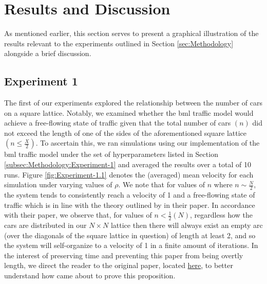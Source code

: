 \section{Results and Discussion}
\label{sec:Results-and-Discussion}
As mentioned earlier, this section serves to present a graphical illustration of the results relevant to the experiments outlined in Section \ref{sec:Methodology} alongside a brief discussion.

\subsection{Experiment 1}
\label{subsec:Results-and-Discussion:Experiment-1}
The first of our experiments explored the relationship between the number of cars on a square lattice. Notably, we examined whether the \gls{bml} traffic model would achieve a free-flowing state of traffic given that the total number of cars $(n)$ did not exceed the length of one of the sides of the aforementioned square lattice $\left(n \leq \frac{X}{2}\right)$. To ascertain this, we ran simulations using our implementation of the \gls{bml} traffic model under the set of hyperparameters listed in Section \ref{subsec:Methodology:Experiment-1} and averaged the results over a total of 10 runs. Figure \ref{fig:Experiment-1.1} denotes the (averaged) mean velocity for each simulation under varying values of $\rho$. We note that for values of $n$ where $n \sim \frac{N}{2}$, the system tends to consistently reach a velocity of 1 and a free-flowing state of traffic which is in line with the theory outlined by \citeauthor{Austin} in their paper. In accordance with their paper, we observe that, for values of  $n < \frac{1}{2}(N)$, regardless how the cars are distributed in our $N \times N$ lattice then there will always exist an empty arc (over the diagonals of the square lattice in question) of length at least 2, and so the system will self-organize to a velocity of 1 in a finite amount of iterations. In the interest of preserving time and preventing this paper from being overtly length, we direct the reader to the original paper, located \href{https://arxiv.org/pdf/math/0607759.pdf}{here}, to better understand how \citeauthor{Austin} came about to prove this proposition. 

